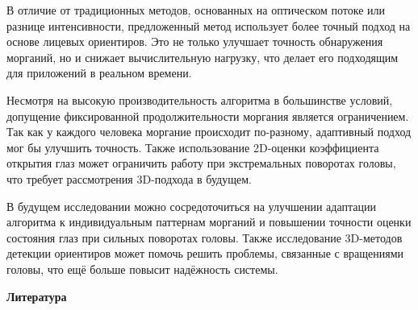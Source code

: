 \begin{multicols}{2}
В отличие от традиционных методов, основанных на оптическом потоке или
разнице интенсивности, предложенный метод использует более точный подход
на основе лицевых ориентиров. Это не только улучшает точность
обнаружения морганий, но и снижает вычислительную нагрузку, что делает
его подходящим для приложений в реальном времени.

Несмотря на высокую производительность алгоритма в большинстве условий,
допущение фиксированной продолжительности моргания является
ограничением. Так как у каждого человека моргание происходит по-разному,
адаптивный подход мог бы улучшить точность. Также использование
2D-оценки коэффициента открытия глаз может ограничить работу при
экстремальных поворотах головы, что требует рассмотрения 3D-подхода в
будущем.

В будущем исследовании можно сосредоточиться на улучшении адаптации
алгоритма к индивидуальным паттернам морганий и повышении точности
оценки состояния глаз при сильных поворотах головы. Также исследование
3D-методов детекции ориентиров может помочь решить проблемы, связанные с
вращениями головы, что ещё больше повысит надёжность системы.
\end{multicols}

\begin{center}
{\bfseries Литература}
\end{center}

